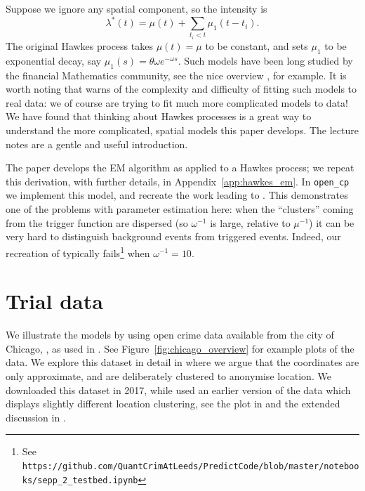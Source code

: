 \documentclass[twoside,a4paper]{article}
\theoremstyle{plain}
\theoremstyle{definition}
\begin{document}
Suppose we ignore any spatial component, so the intensity is
\[ \lambda^*(t) = \mu(t) + \sum_{t_i<t} \mu_1(t-t_i). \]
The original Hawkes process takes $\mu(t)=\mu$ to be constant, and sets $\mu_1$ to
be exponential decay, say $\mu_1(s) = \theta \omega e^{-\omega s}$.  Such models have
been long studied by the financial Mathematics community, see the nice overview \cite{ltp},
for example.  It is worth noting that \cite[Section~4]{ltp} warns of the complexity and
difficulty of fitting such models to real data: we of course are trying to fit much more
complicated models to data!  We have found that thinking about Hawkes processes is
a great way to understand the more complicated, spatial models this paper develops.
The lecture notes \cite{ras} are a gentle and useful introduction.

The paper \cite{lm} develops the EM algorithm as applied to a Hawkes process; we
repeat this derivation, with further details, in Appendix~\ref{app:hawkes_em}.
In \texttt{open\_cp} we implement this model, and recreate the work leading to
\cite[Figure~1]{lm}.  This demonstrates one of the problems with parameter estimation here:
when the ``clusters'' coming from the trigger function are dispersed (so $\omega^{-1}$ is
large, relative to $\mu^{-1}$) it can be very hard to distinguish background events from
triggered events.  Indeed, our recreation of \cite[Figure~1]{lm} typically
fails\footnote{See \texttt{https://github.com/QuantCrimAtLeeds/PredictCode/blob/master/notebooks/sepp\_2\_testbed.ipynb}}
when $\omega^{-1}=10$.



\section{Trial data}

We illustrate the models by using open crime data available from the city of Chicago,
\cite{cdata}, as used in \cite{rc}.  See Figure~\ref{fig:chicago_overview} for example
plots of the data.  We explore this dataset in detail in \cite{daws1} where we argue
that the coordinates are only approximate, and are deliberately clustered to anonymise
location.  We downloaded this dataset in 2017, while \cite{rc} used an earlier version of
the data which displays slightly different location clustering, see the plot in \cite{rc}
and the extended discussion in \cite{daws1}.
\end{document}
